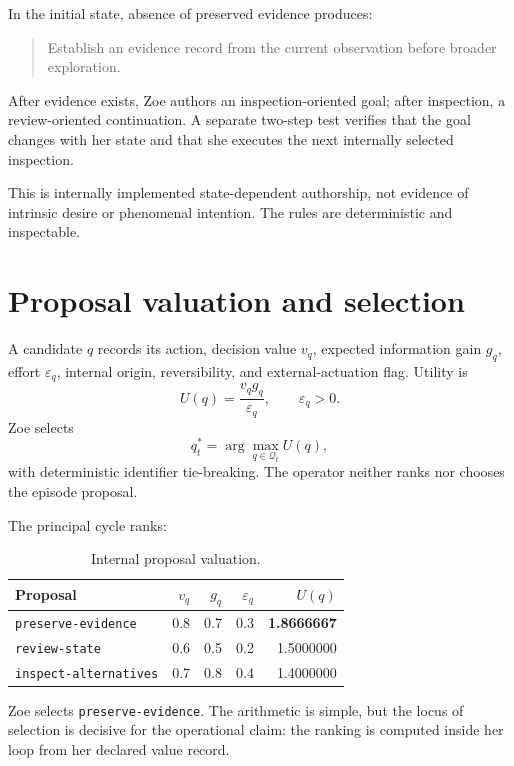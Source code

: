 \documentclass[11pt,a4paper]{article}
\begin{document}
In the initial state, absence of preserved evidence produces:
\begin{quote}
Establish an evidence record from the current observation before broader exploration.
\end{quote}
After evidence exists, Zoe authors an inspection-oriented goal; after inspection, a review-oriented continuation. A separate two-step test verifies that the goal changes with her state and that she executes the next internally selected inspection.

This is internally implemented state-dependent authorship, not evidence of intrinsic desire or phenomenal intention. The rules are deterministic and inspectable.

\section{Proposal valuation and selection}
A candidate $q$ records its action, decision value $v_q$, expected information gain $g_q$, effort $\varepsilon_q$, internal origin, reversibility, and external-actuation flag. Utility is
\begin{equation}
U(q)=\frac{v_qg_q}{\varepsilon_q},\qquad \varepsilon_q>0.
\label{eq:utility}
\end{equation}
Zoe selects
\begin{equation}
q_t^*=\arg\max_{q\in\mathcal Q_t}U(q),
\label{eq:selection}
\end{equation}
with deterministic identifier tie-breaking. The operator neither ranks nor chooses the episode proposal.

The principal cycle ranks:
\begin{table}[htbp]
\centering
\caption{Internal proposal valuation.}
\label{tab:proposals}
\begin{tabular}{lrrrr}
\toprule
Proposal&$v_q$&$g_q$&$\varepsilon_q$&$U(q)$\\
\midrule
\texttt{preserve-evidence}&0.8&0.7&0.3&\textbf{1.8666667}\\
\texttt{review-state}&0.6&0.5&0.2&1.5000000\\
\texttt{inspect-alternatives}&0.7&0.8&0.4&1.4000000\\
\bottomrule
\end{tabular}
\end{table}
Zoe selects \texttt{preserve-evidence}. The arithmetic is simple, but the locus of selection is decisive for the operational claim: the ranking is computed inside her loop from her declared value record.
\end{document}
